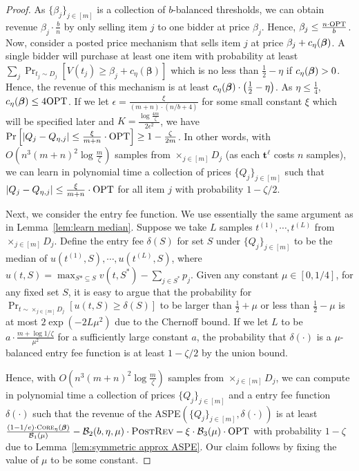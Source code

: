 \begin{proof}
	As $\{\beta_j\}_{j\in[m]}$ is a collection of $b$-balanced thresholds, we can obtain revenue $\beta_j\cdot \frac{b}{n}$ by only selling item $j$ to one bidder at price $\beta_j$. 
	Hence,  $\beta_j\leq \frac{n\cdot\text{OPT}}{b}$. 
	Now, consider a posted price mechanism that sells item $j$ at price $\beta_j+c_\eta(\boldsymbol{\beta})$. 
	A single bidder will purchase at least one item with probability at least $\sum_j \Pr_{t_{j}\sim D_{j}}\left[V(t_{j})\geq \beta_{j}+c_\eta(\boldsymbol{\beta})\right]$ which is no less than  $\frac{1}{2}-\eta$ if $c_\eta(\boldsymbol{\beta})>0$. 
	Hence, the revenue of this mechanism is at least $c_\eta(\boldsymbol{\beta})\cdot \left(\frac{1}{2}-\eta\right)$. 
	As $\eta\leq \frac{1}{4}$, $c_\eta(\boldsymbol{\beta})\leq 4\text{OPT}$. 
	If we let $\epsilon = \frac{\xi}{(m+n)\cdot\left(n/b+4\right)}$ for some small constant $\xi$ which will be specified later and $K =\frac{\log \frac{4m}{\zeta}}{2\epsilon^2}$, we have $\Pr\left[\left|Q_j-Q_{\eta,j}\right|\leq \frac{\xi}{m+n}\cdot\text{OPT} \right]\geq 1-\frac{\zeta}{2m}$. 
	In other words, with $O\left(n^3(m+n)^2\log \frac{m}{\zeta}\right)$ samples from $\times_{j\in[m]} D_j$ (as each $\boldsymbol{t}^{\ell}$ costs $n$ samples), we can learn in polynomial time a collection of prices $\{Q_j\}_{j\in [m]}$ such that $\left|Q_j-Q_{\eta,j}\right|\leq \frac{\xi}{m+n}\cdot\text{OPT} $ for all item $j$ with probability $1-\zeta/2$.
	
	Next, we consider the entry fee function. We use essentially the same argument as in Lemma~\ref{lem:learn median}. Suppose we take
$L$ samples $t^{(1)},\cdots, t^{(L)}$ from $\times_{j\in[m]} D_j$. Define the entry fee $\delta(S)$
 for set $S$ under $\{Q_j\}_{j\in[m]}$ to be the median of $u(t^{(1)},S),\cdots, u(t^{(L)},S)$, where $u(t,S)=\max_{S*\subseteq S} v(t,S^*)-\sum_{j\in S^*} p_j$. Given any constant $\mu\in[0,1/4]$, for any fixed set $S$, it is easy to argue that the probability for $\Pr_{t\sim \times_{j\in[m]} D_j}[u(t,S)\geq \delta(S)]$ to be larger than  $\frac{1}{2}+\mu$ or less than  $\frac{1}{2}-\mu$ is at most $2\exp(-2L\mu^2)$ due to the Chernoff bound. If we let $L$ to be $a\cdot \frac{m+\log 1/\zeta}{\mu^2}$ for a sufficiently large constant $a$, the probability that $\delta(\cdot)$ is a $\mu$-balanced entry fee function is at least $1-\zeta/2$ by the union bound.
 
 Hence, with $O\left(n^3(m+n)^2\log \frac{m}{\zeta}\right)$ samples from  $\times_{j\in[m]} D_j$, we can compute in polynomial time a collection of prices $\{Q_j\}_{j\in[m]}$ and a entry fee function $\delta(\cdot)$ such that the revenue of the ASPE$\left(\{Q_j\}_{j\in[m]},\delta(\cdot)\right)$ is at least $\frac{(1-1/e)\cdot\textsc{Core}_{\eta}(\boldsymbol{\beta})}{{\cal B}_{1}(\mu)}-{\cal B}_{2}(b,\eta,\mu)\cdot \textsc{PostRev}-\xi\cdot{\cal B}_3(\mu)\cdot \text{OPT}$ with probability $1-\zeta$ due to Lemma~\ref{lem:symmetric approx ASPE}. Our claim follows by fixing the value of $\mu$ to be some constant.
	\end{proof}


